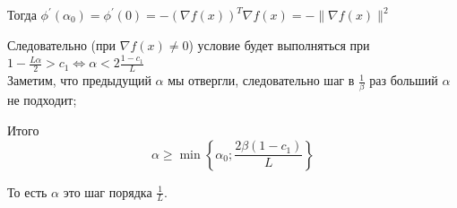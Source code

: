 Тогда $\phi^{\prime}(\alpha_0) = \phi^{\prime}(0) = - (\nabla f(x))^T \nabla f(x) = - \|\nabla f(x)\|^2$

Следовательно (при $\nabla f(x) \ne 0$) условие будет выполняться при $1 - \frac{L\alpha}{2} > c_{1} \Leftrightarrow \alpha < 2 \frac{1-c_1}{L}$ \\
Заметим, что предыдущий $\alpha$ мы отвергли, следовательно шаг в $\frac{1}{\beta}$ раз больший $\alpha$ не подходит;

Итого
\[\alpha \ge \min \left\{ \alpha_0; \frac{2\beta(1-c_1)}{L} \right\}\]

То есть $\alpha$ это шаг порядка $\frac{1}{L}$.
